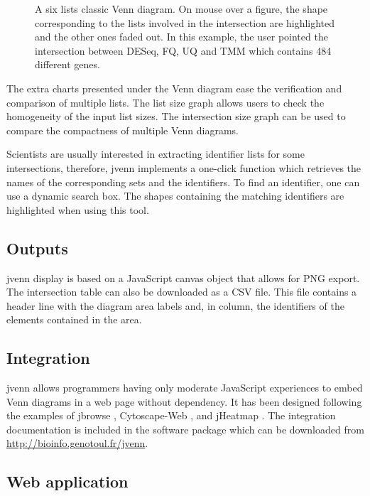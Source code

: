 \documentclass[11pt]{bmc_article_s50}
\begin{document}
  \begin{figure}[h!]
  \hrulefill
  \vskip-5pt
\caption{A six lists classic Venn diagram.
      On mouse over a figure, the shape corresponding to the lists involved in
      the intersection are highlighted and the other ones faded out. In
      this example, the user pointed the intersection between DESeq, FQ, UQ and
      TMM which contains 484 different genes.
      }\label{fig1}
   \vskip-5pt
\hrulefill
\end{figure}

The extra charts presented under the Venn diagram ease the verification and
comparison of multiple lists. The list size graph allows users to check the
homogeneity of the input list sizes. The intersection size graph can be used to
compare the compactness of multiple Venn diagrams.

Scientists are usually interested in extracting identifier lists for some
intersections, therefore, jvenn implements a one-click function which retrieves
the names of the corresponding sets and the identifiers. To find an identifier,
one can use a dynamic search box. The shapes containing the matching
identifiers are highlighted when using this tool.

\subsection*{Outputs}

jvenn display is based on a JavaScript canvas object that allows for PNG
export. The intersection table can also be downloaded as a CSV file. This file
contains a header line with the diagram area labels and, in column, the
identifiers of the elements contained in the area.

\subsection*{Integration}

jvenn allows programmers having only moderate JavaScript experiences to embed
Venn diagrams in a web page without dependency. It has been designed following
the examples of jbrowse \cite{Westesson01032013}, Cytoscape-Web
\cite{Lopes2010}, and jHeatmap \cite{DeuPons2014}.
The integration documentation is included in the software package which can be
downloaded from \url{http://bioinfo.genotoul.fr/jvenn}.

\subsection*{Web application}
\end{document}
